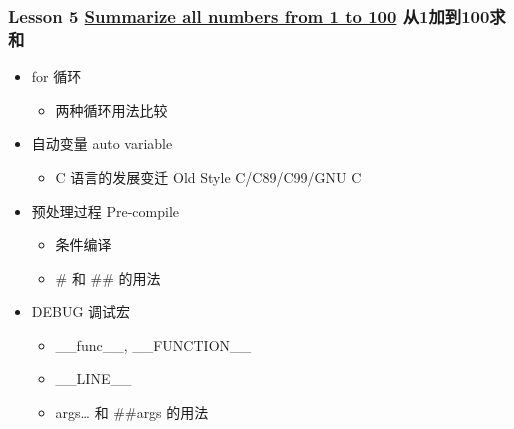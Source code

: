\begin{frame}\frametitle{Lesson 5 \href{Lesson-5.md}{Summarize all
numbers from 1 to 100} 从1加到100求和}

\begin{itemize}
\item
  for 循环
  \begin{itemize}
  \item
    两种循环用法比较
  \end{itemize}
\item
  自动变量 auto variable
  \begin{itemize}
  \item
    C 语言的发展变迁 Old Style C/C89/C99/GNU C\\
  \end{itemize}
\item
  预处理过程 Pre-compile
  \begin{itemize}
  \item
    条件编译
  \item
    \# 和 \#\# 的用法
  \end{itemize}
\item
  DEBUG 调试宏
  \begin{itemize}
  \item
    \_\_func\_\_, \_\_FUNCTION\_\_
  \item
    \_\_LINE\_\_\\
  \item
    args\ldots{} 和 \#\#args 的用法
  \end{itemize}
\end{itemize}
\end{frame}

